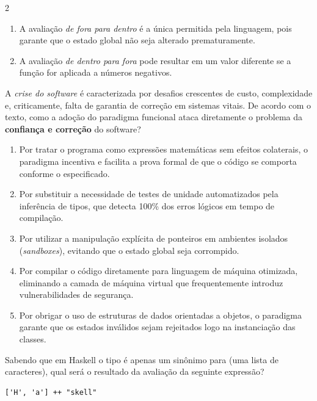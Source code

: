 \documentclass[a4paper,10pt,brazil]{article}
\begin{document}
\begin{multicols}{2}
\begin{enumerate}
  \item A avaliação \emph{de fora para dentro} é a única permitida pela linguagem, pois garante que o estado global não seja alterado prematuramente.

  \item A avaliação \emph{de dentro para fora} pode resultar em um valor diferente se a função  for aplicada a números negativos.


\end{enumerate}

A \emph{crise do software} é caracterizada por desafios crescentes de custo, complexidade e, criticamente, falta de garantia de correção em sistemas vitais. De acordo com o texto, como a adoção do paradigma funcional ataca diretamente o problema da \textbf{confiança e correção} do software?

\begin{enumerate}
  \item Por tratar o programa como expressões matemáticas sem efeitos colaterais, o paradigma incentiva e facilita a prova formal de que o código se comporta conforme o especificado.

  \item Por substituir a necessidade de testes de unidade automatizados pela inferência de tipos, que detecta 100\% dos erros lógicos em tempo de compilação.

  \item Por utilizar a manipulação explícita de ponteiros em ambientes isolados (\emph{sandboxes}), evitando que o estado global seja corrompido.

  \item Por compilar o código diretamente para linguagem de máquina otimizada, eliminando a camada de máquina virtual que frequentemente introduz vulnerabilidades de segurança.

  \item Por obrigar o uso de estruturas de dados orientadas a objetos, o paradigma garante que os estados inválidos sejam rejeitados logo na instanciação das classes.


\end{enumerate}

Sabendo que em Haskell o tipo  é apenas um sinônimo para \haskellinline{[Char]} (uma lista de caracteres), qual será o resultado da avaliação da seguinte expressão?
\begin{verbatim}
['H', 'a'] ++ "skell"
\end{verbatim}


\end{multicols}
\end{document}
